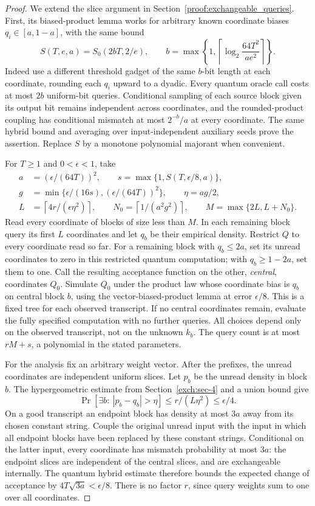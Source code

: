 \begin{proof}
We extend the slice argument in Section~\ref{proof:exchangeable_queries}.
First, its biased-product lemma works for arbitrary known coordinate
biases \(q_i\in[a,1-a]\), with the same bound
\[
 S(T,e,a)=S_0(2bT,2/e),\qquad
 b=\max\left\{1,\left\lceil
 \log_2\frac{64T^2}{ae^2}\right\rceil\right\}.
\]
Indeed use a different threshold gadget of the same \(b\)-bit length at
each coordinate, rounding each \(q_i\) upward to a dyadic. Every quantum
oracle call costs at most \(2b\) uniform-bit queries. Conditional sampling
of each source block given its output bit remains independent across
coordinates, and the rounded-product coupling has conditional mismatch
at most \(2^{-b}/a\) at every coordinate. The same hybrid bound and
averaging over input-independent auxiliary seeds prove the assertion.
Replace \(S\) by a monotone polynomial majorant when convenient.

For \(T\ge1\) and \(0<\epsilon<1\), take
\[
\begin{split}
a&=(\epsilon/(64T))^2,\qquad
s=\max\{1,S(T,\epsilon/8,a)\},\\
g&=\min\{\epsilon/(16s),(\epsilon/(64T))^2\},\qquad
\eta=ag/2,\\
L&=\left\lceil4r/(\epsilon\eta^2)\right\rceil,\qquad
N_0=\left\lceil1/(a^2g^2)\right\rceil,\qquad
M=\max\{2L,L+N_0\}.
\end{split}
\]
Read every coordinate of blocks of size less than \(M\). In each
remaining block query its first \(L\) coordinates and let \(q_b\) be
their empirical density. Restrict \(Q\) to every coordinate read so far.
For a remaining block with \(q_b\le2a\), set its unread coordinates to
zero in this restricted quantum computation; with \(q_b\ge1-2a\), set
them to one. Call the resulting acceptance function on the other,
\emph{central}, coordinates \(Q_0\). Simulate \(Q_0\) under the product
law whose coordinate bias is \(q_b\) on central block \(b\), using the
vector-biased-product lemma at error \(\epsilon/8\). This is a fixed
tree for each observed transcript. If no central coordinates remain,
evaluate the fully specified computation with no further queries.
All choices depend only on the observed transcript, not on the unknown
\(k_b\). The query count is at most \(rM+s\), a polynomial in the stated
parameters.

For the analysis fix an arbitrary weight vector. After the prefixes,
the unread coordinates are independent uniform slices. Let \(p_b\)
be the unread density in block \(b\). The hypergeometric estimate from
Section~\ref{exch:sec-4} and a union bound give
\[
 \Pr[\exists b:\ |p_b-q_b|>\eta]\le r/(L\eta^2)\le\epsilon/4.
\]
On a good transcript an endpoint block has density at most \(3a\) away
from its chosen constant string. Couple the original unread input with
the input in which all endpoint blocks have been replaced by these
constant strings. Conditional on the latter input, every coordinate has
mismatch probability at most \(3a\): the endpoint slices are independent
of the central slices, and are exchangeable internally. The quantum
hybrid estimate therefore bounds the expected change of acceptance by
\(4T\sqrt{3a}<\epsilon/8\). There is no factor \(r\), since query
weights sum to one over all coordinates.


\end{proof}
